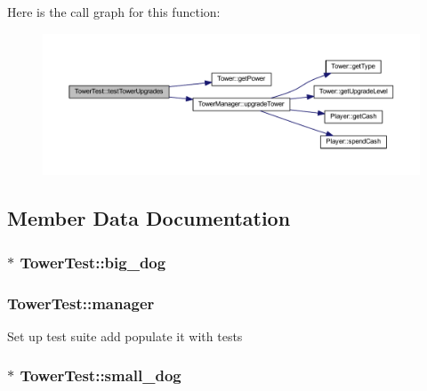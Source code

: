 Here is the call graph for this function\+:
\nopagebreak
\begin{figure}[H]
\begin{center}
\leavevmode
\includegraphics[width=350pt]{class_tower_test_ace6c736cadac380b8d9adf0d7c853979_cgraph}
\end{center}
\end{figure}




\subsection{Member Data Documentation}
\hypertarget{class_tower_test_a9468a416c0811ad87dcc103385d8a248}{
\subsubsection[{big\+\_\+dog}]{$\ast$ Tower\+Test\+::big\+\_\+dog\hspace{0.3cm}{\ttfamily [private]}}}\label{class_tower_test_a9468a416c0811ad87dcc103385d8a248}
\hypertarget{class_tower_test_aeef90091c2db96edb1f6610b0e2d3715}{
\subsubsection[{manager}]{ Tower\+Test\+::manager\hspace{0.3cm}{\ttfamily [private]}}}\label{class_tower_test_aeef90091c2db96edb1f6610b0e2d3715}
Set up test suite add populate it with tests \hypertarget{class_tower_test_aef4dab96f03105798c39ca8d33ae6940}{
\subsubsection[{small\+\_\+dog}]{$\ast$ Tower\+Test\+::small\+\_\+dog\hspace{0.3cm}{\ttfamily [private]}}}\label{class_tower_test_aef4dab96f03105798c39ca8d33ae6940}


